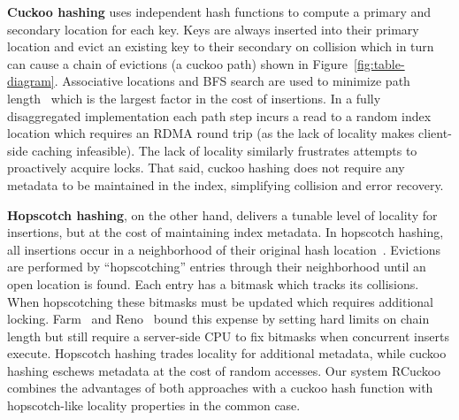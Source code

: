 \textbf{Cuckoo hashing} uses independent hash functions to compute a primary and secondary location
for each key. Keys are always inserted into their primary location and evict an existing key to
their secondary on collision which in turn can cause a chain of evictions (a cuckoo path) shown in
Figure~\ref{fig:table-diagram}. Associative locations and BFS search are used to minimize path
length~\cite{memc3,cuckoo-improvements} which is the largest factor in the cost of insertions. 
In a fully disaggregated implementation each path step incurs a read to a random index location
which requires an RDMA round trip (as the lack of locality makes client-side caching infeasible).  The lack of locality similarly frustrates attempts to proactively acquire locks.
That said, cuckoo hashing
does not require any metadata to be maintained in the index, simplifying collision and error recovery.

\textbf{Hopscotch hashing}, on the other hand, delivers a tunable
level of locality for insertions, but at the cost of maintaining index
metadata.  In hopscotch hashing, all insertions occur in a
neighborhood of their original hash
location~\cite{farm,hopscotch}. Evictions are performed by
``hopscotching'' entries through their neighborhood until an open
location is found.  Each entry has a bitmask which tracks its
collisions. When hopscotching these bitmasks must be updated which
requires additional locking.  Farm~\cite{farm} and Reno~\cite{reno}
bound this expense by setting hard limits on chain length but still
require a server-side CPU to fix bitmasks when concurrent inserts
execute.
Hopscotch hashing trades locality for additional metadata, while
cuckoo hashing eschews metadata at the cost of random accesses. Our system RCuckoo combines the
advantages of both approaches with a cuckoo hash function with hopscotch-like locality
properties in the common case.



